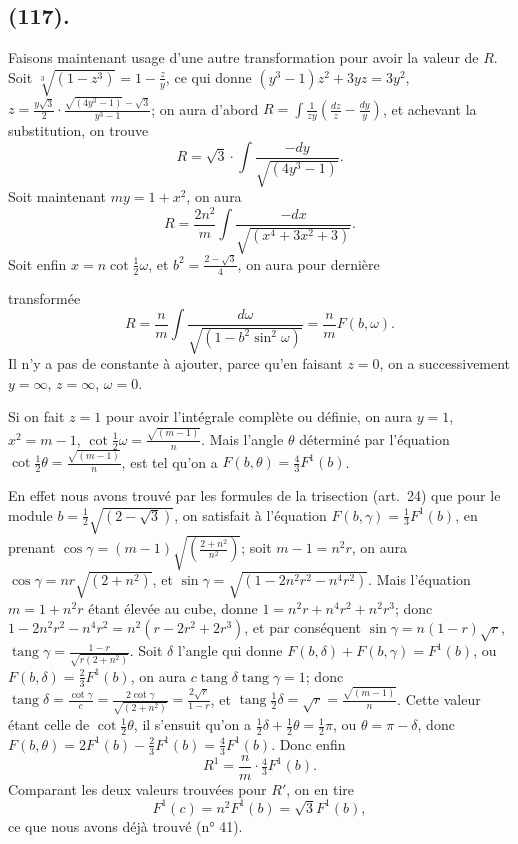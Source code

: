 \documentclass{article}
\begin{document}
\subsection*{(117).}

Faisons maintenant usage d'une autre transformation pour avoir la valeur de $R$. Soit $\sqrt[3]{(1-z^{3})}=1-\frac{z}{y}$, ce qui donne $(y^{3}-1)z^{2}+3yz=3y^{2}$, $z=\frac{y\sqrt{3}}{2}\cdot\frac{\sqrt{(4y^{3}-1)}-\sqrt{3}}{y^{3}-1}$; on aura d'abord $R=\displaystyle\int\frac{1}{zy}\left(\frac{dz}{z}-\frac{dy}{y}\right)$, et achevant la substitution, on trouve
\[ R=\sqrt{3}\cdot\int\frac{-dy}{\sqrt{(4y^{3}-1)}}. \]
Soit maintenant $my=1+x^{2}$, on aura
\[ R=\frac{2n^{2}}{m}\int\frac{-dx}{\sqrt{(x^{4}+3x^{2}+3)}}. \]
Soit enfin $x=n\cot\frac{1}{2}\omega$, et $b^{2}=\frac{2-\sqrt{3}}{4}$, on aura pour dernière

transformée
\[ R=\frac{n}{m}\int\frac{d\omega}{\sqrt{(1-b^{2}\sin^{2}\omega)}}=\frac{n}{m}F(b,\omega). \]
Il n'y a pas de constante à ajouter, parce qu'en faisant $z=0$, on a successivement $y=\infty$, $z=\infty$, $\omega=0$.

Si on fait $z=1$ pour avoir l'intégrale complète ou définie, on aura $y=1$, $x^{2}=m-1$, $\cot\frac{1}{2}\omega=\frac{\sqrt{(m-1)}}{n}$. Mais l'angle $\theta$ déterminé par l'équation $\cot\frac{1}{2}\theta=\frac{\sqrt{(m-1)}}{n}$, est tel qu'on a $F(b,\theta)=\frac{4}{3}F^{1}(b)$.

En effet nous avons trouvé par les formules de la trisection (art.\ 24) que pour le module $b=\frac{1}{2}\sqrt{(2-\sqrt{3})}$, on satisfait à l'équation $F(b,\gamma)=\frac{1}{3}F^{1}(b)$, en prenant $\cos\gamma=(m-1)\sqrt{\left(\frac{2+n^{2}}{n^{2}}\right)}$; soit $m-1=n^{2}r$, on aura $\cos\gamma=nr\sqrt{(2+n^{2})}$, et $\sin\gamma=\sqrt{(1-2n^{2}r^{2}-n^{4}r^{2})}$. Mais l'équation $m=1+n^{2}r$ étant élevée au cube, donne $1=n^{2}r+n^{4}r^{2}+n^{2}r^{3}$; donc $1-2n^{2}r^{2}-n^{4}r^{2}=n^{2}(r-2r^{2}+2r^{3})$, et par conséquent $\sin\gamma=n(1-r)\sqrt{r}$, $\operatorname{tang}\gamma=\frac{1-r}{\sqrt{r(2+n^{2})}}$. Soit $\delta$ l'angle qui donne $F(b,\delta)+F(b,\gamma)=F^{1}(b)$, ou $F(b,\delta)=\frac{2}{3}F^{1}(b)$, on aura $c\operatorname{tang}\delta\operatorname{tang}\gamma=1$; donc $\operatorname{tang}\delta=\frac{\cot\gamma}{c}=\frac{2\cot\gamma}{\sqrt{(2+n^{2})}}=\frac{2\sqrt{r}}{1-r}$, et $\operatorname{tang}\frac{1}{2}\delta=\sqrt{r}=\frac{\sqrt{(m-1)}}{n}$. Cette valeur étant celle de $\cot\frac{1}{2}\theta$, il s'ensuit qu'on a $\frac{1}{2}\delta+\frac{1}{2}\theta=\frac{1}{2}\pi$, ou $\theta=\pi-\delta$, donc $F(b,\theta)=2F^{1}(b)-\frac{2}{3}F^{1}(b)=\frac{4}{3}F^{1}(b)$. Donc enfin
\[ R^{1}=\frac{n}{m}\cdot\tfrac{4}{3}F^{1}(b). \]
Comparant les deux valeurs trouvées pour $R'$, on en tire
\[ F^{1}(c)=n^{2}F^{1}(b)=\sqrt{3}F^{1}(b), \]
ce que nous avons déjà trouvé (n° 41).
\end{document}
